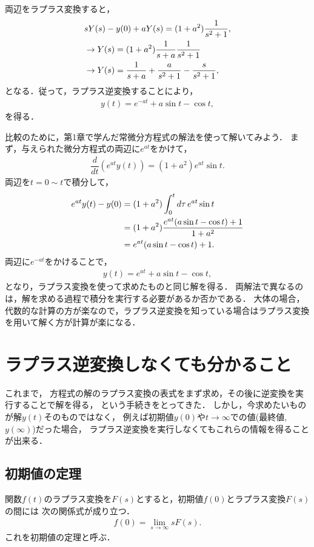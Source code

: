 両辺をラプラス変換すると，
\begin{align}
& sY(s) - y(0) + a Y(s) = (1+a^2)\dfrac{1}{s^2 + 1}, \notag \\
& \rightarrow Y(s) = (1+a^2)\dfrac{1}{s+a}\dfrac{1}{s^2+1} \notag \\
& \rightarrow Y(s) = \dfrac{1}{s+a} + \dfrac{a}{s^2+1} - \dfrac{s}{s^2+1}, 
\end{align}
となる．従って，ラプラス逆変換することにより，
\begin{align}
 y(t) = e^{-at} + a \sin t - \cos t, 
\end{align}
を得る．
\vspace*{.2cm}

比較のために，第1章で学んだ常微分方程式の解法を使って解いてみよう．
まず，与えられた微分方程式の両辺に$e^{at}$をかけて，
\begin{align}
  \dfrac{d}{dt}\left(e^{at}y(t)\right) = (1+a^2)e^{at}\sin t. 
\end{align}
両辺を$t=0\sim t$で積分して，
\begin{align}
  e^{at}y(t) - y(0) 
  &= (1+a^2)\int_{0}^{t}d\tau\, e^{at}\sin t \notag \\
  &= (1+a^2)\dfrac{e^{at}(a\sin t - \cos t) + 1}{1+a^2} \notag \\
  &= e^{at}(a\sin t - \cos t) + 1.
\end{align}
両辺に$e^{-at}$をかけることで，
\begin{align}
  y(t) = e^{at} + a\sin t -\cos t, 
\end{align}
となり，ラプラス変換を使って求めたものと同じ解を得る．
両解法で異なるのは，解を求める過程で積分を実行する必要があるか否かである．
大体の場合，代数的な計算の方が楽なので，ラプラス逆変換を知っている場合はラプラス変換を用いて解く方が計算が楽になる．
%
\newpage
%
\section{ラプラス逆変換しなくても分かること}
%
これまで，
方程式の解のラプラス変換の表式をまず求め，その後に逆変換を実行することで解を得る，
という手続きをとってきた．
しかし，今求めたいものが解$y(t)$そのものではなく，
例えば初期値$y(0)$や$t\to\infty$での値(最終値, $y(\infty)$)だった場合，
ラプラス逆変換を実行しなくてもこれらの情報を得ることが出来る．
%
\subsection{初期値の定理}
関数$f(t)$のラプラス変換を$F(s)$とすると，初期値$f(0)$とラプラス変換$F(s)$の間には
次の関係式が成り立つ．
\begin{align}
 f(0) = \lim_{s\to \infty}sF(s). 
\end{align}
これを初期値の定理と呼ぶ．

